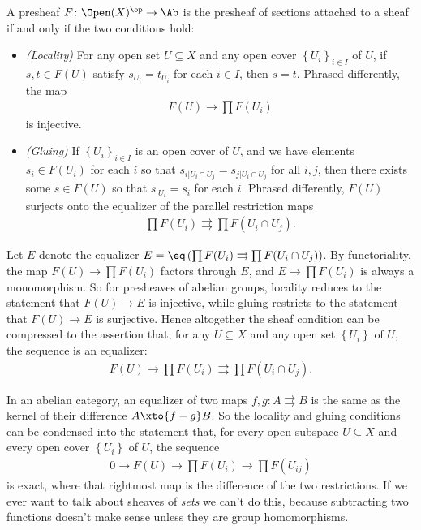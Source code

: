 \documentclass[11pt]{amsart}
\begin{document}
\begin{theorem} A presheaf $F \colon \Open(X)^\op \to \Ab$ is the presheaf of sections attached to a sheaf if and only if the two conditions hold:
\begin{itemize}
    \item[\textbf{Sh1}] \textit{(Locality)} For any open set $U \subseteq X$ and any open cover $\left\{ U_i \right\}_{i\in I}$ of $U$, if $s,t\in F(U)$ satisfy $s_{U_i} = t_{U_i}$ for each $i \in I$, then $s=t$. Phrased differently, the map
    \begin{align*}
        F(U) \to \prod F(U_i)
    \end{align*}
    is injective.

    \item[\textbf{Sh2}] \textit{(Gluing)} If $\left\{ U_i \right\}_{i\in I}$ is an open cover of $U$, and we have elements $s_i \in F(U_i)$ for each $i$ so that $s_{i|U_i\cap U_j} = s_{j|U_i\cap U_j}$ for all $i,j$, then there exists some $s\in F(U)$ so that $s_{|U_i} = s_i$ for each $i$. Phrased differently, $F(U)$ surjects onto the equalizer of the parallel restriction maps
    \begin{align*}
        \prod F(U_i) \rightrightarrows \prod F(U_i\cap U_j).
    \end{align*}
\end{itemize}
\end{theorem}

\begin{remark} Let $E$ denote the equalizer $E = \eq \left( \prod F(U_i) \rightrightarrows \prod F(U_i\cap U_j) \right)$. By functoriality, the map $F(U) \to \prod F(U_i)$ factors through $E$, and $E \to \prod F(U_i)$ is always a monomorphism. So for presheaves of abelian groups, locality reduces to the statement that $F(U) \to E$ is injective, while gluing restricts to the statement that $F(U) \to E$ is surjective. Hence altogether the sheaf condition can be compressed to the assertion that, for any $U \subseteq X$ and any open set $\left\{ U_i \right\}$ of $U$, the sequence is an equalizer:
\begin{align*}
    F(U) \to \prod F(U_i) \rightrightarrows \prod F(U_i\cap U_j).
\end{align*}
\end{remark}


\begin{remark} In an abelian category, an equalizer of two maps $f,g \colon A \rightrightarrows B$ is the same as the kernel of their difference $A \xto{f-g} B$. So the locality and gluing conditions can be condensed into the statement that, for every open subspace $U \subseteq X$ and every open cover $\left\{ U_i \right\}$ of $U$, the sequence
\begin{align*}
    0 \to F(U) \to \prod F(U_i) \to \prod F(U_{ij})
\end{align*}
is exact, where that rightmost map is the difference of the two restrictions. If we ever want to talk about sheaves of \emph{sets} we can't do this, because subtracting two functions doesn't make sense unless they are group homomorphisms.
\end{remark}
\end{document}
